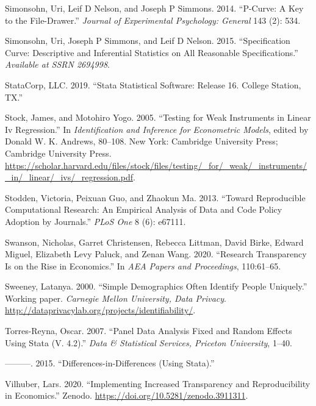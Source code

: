 \documentclass[
]{book}
\begin{document}
\leavevmode\hypertarget{ref-simonsohn2014p}{}%
Simonsohn, Uri, Leif D Nelson, and Joseph P Simmons. 2014. ``P-Curve: A Key to the File-Drawer.'' \emph{Journal of Experimental Psychology: General} 143 (2): 534.

\leavevmode\hypertarget{ref-simonsohn2015specification}{}%
Simonsohn, Uri, Joseph P Simmons, and Leif D Nelson. 2015. ``Specification Curve: Descriptive and Inferential Statistics on All Reasonable Specifications.'' \emph{Available at SSRN 2694998}.

\leavevmode\hypertarget{ref-statacorp2019stata}{}%
StataCorp, LLC. 2019. ``Stata Statistical Software: Release 16. College Station, TX.''

\leavevmode\hypertarget{ref-stock2005weak}{}%
Stock, James, and Motohiro Yogo. 2005. ``Testing for Weak Instruments in Linear Iv Regression.'' In \emph{Identification and Inference for Econometric Models}, edited by Donald W. K. Andrews, 80--108. New York: Cambridge University Press; Cambridge University Press. \url{https://scholar.harvard.edu/files/stock/files/testing/_for/_weak/_instruments/_in/_linear/_ivs/_regression.pdf}.

\leavevmode\hypertarget{ref-stodden2013toward}{}%
Stodden, Victoria, Peixuan Guo, and Zhaokun Ma. 2013. ``Toward Reproducible Computational Research: An Empirical Analysis of Data and Code Policy Adoption by Journals.'' \emph{PLoS One} 8 (6): e67111.

\leavevmode\hypertarget{ref-swanson2020research}{}%
Swanson, Nicholas, Garret Christensen, Rebecca Littman, David Birke, Edward Miguel, Elizabeth Levy Paluck, and Zenan Wang. 2020. ``Research Transparency Is on the Rise in Economics.'' In \emph{AEA Papers and Proceedings}, 110:61--65.

\leavevmode\hypertarget{ref-Sweeney2000}{}%
Sweeney, Latanya. 2000. ``Simple Demographics Often Identify People Uniquely.'' Working paper. \emph{Carnegie Mellon University, Data Privacy}. \url{http://dataprivacylab.org/projects/identifiability/}.

\leavevmode\hypertarget{ref-torres2007}{}%
Torres-Reyna, Oscar. 2007. ``Panel Data Analysis Fixed and Random Effects Using Stata (V. 4.2).'' \emph{Data \& Statistical Services, Priceton University}, 1--40.

\leavevmode\hypertarget{ref-torres2015}{}%
---------. 2015. ``Differences-in-Differences (Using Stata).''

\leavevmode\hypertarget{ref-vilhuber_lars_2020_3911311}{}%
Vilhuber, Lars. 2020. ``Implementing Increased Transparency and Reproducibility in Economics.'' Zenodo. \url{https://doi.org/10.5281/zenodo.3911311}.
\end{document}
